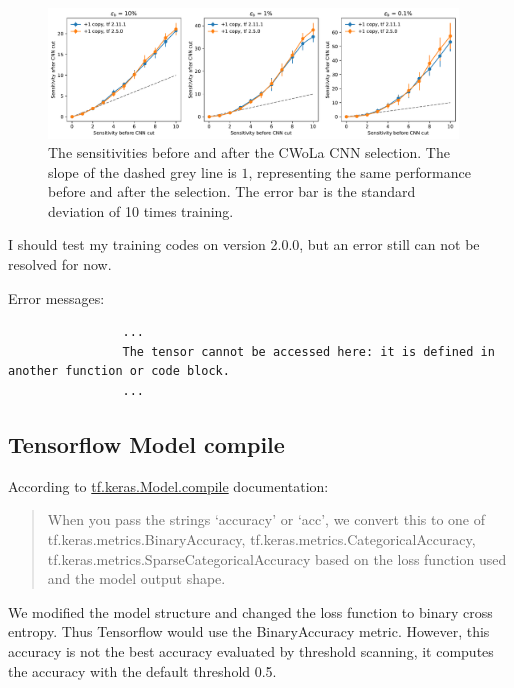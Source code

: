 \documentclass[12pt]{article}
\begin{document}
			\begin{figure}[htpb]
				\centering
				\includegraphics[width=0.97\textwidth]{HVmodel_sensitivity_improvement_bkg_eff_copy_1_tf_250.pdf}
				\caption{The sensitivities before and after the CWoLa CNN selection. The slope of the dashed grey line is $1$, representing the same performance before and after the selection. The error bar is the standard deviation of 10 times training.}
				\label{fig:sensitivity_improvement_bkg_eff_tf_250}
			\end{figure} 

			I should test my training codes on version 2.0.0, but an error still can not be resolved for now.

			Error messages:
			\begin{verbatim}
				...
				The tensor cannot be accessed here: it is defined in another function or code block. 
				...
			\end{verbatim}
	\subsection{Tensorflow Model compile}%
	\label{sub:tensorflow_model_compile}
		According to \href{https://www.tensorflow.org/api_docs/python/tf/keras/Model#compile}{tf.keras.Model.compile} documentation:
		\begin{quote}
			When you pass the strings `accuracy' or `acc', we convert this to one of \newline tf.keras.metrics.BinaryAccuracy, tf.keras.metrics.CategoricalAccuracy, \newline tf.keras.metrics.SparseCategoricalAccuracy based on the loss function used and the model output shape.
		\end{quote}
		We modified the model structure and changed the loss function to binary cross entropy. Thus Tensorflow would use the BinaryAccuracy metric. However, this accuracy is not the best accuracy evaluated by threshold scanning, it computes the accuracy with the default threshold 0.5.
\end{document}
